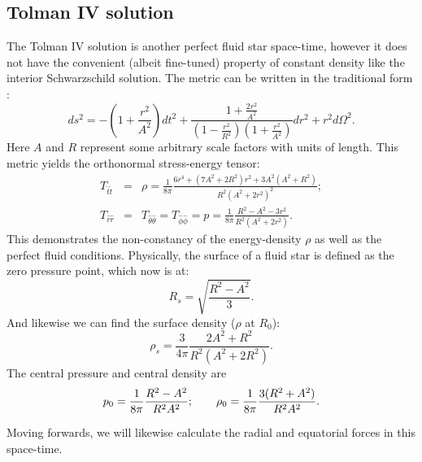 \documentclass[12pt]{article}
\begin{document}
\subsection{Tolman IV solution}
The Tolman IV solution is another perfect fluid star space-time, however it does not have the convenient (albeit fine-tuned) property of constant density like the interior Schwarzschild solution. The metric can be written in the traditional form \cite{Delgaty}:
%
\begin{equation}
    ds^2 = -\left(1 + \frac{r^2}{A^2}\right)dt^2 +  \frac{1  + \frac{2r^2}{A^2}}{\left(1- \frac{r^2}{R^2}\right)\left(1+ \frac{r^2}{A^2}\right)}dr^2 + r^2d\Omega^2.
\end{equation}
%
Here $A$ and $R$ represent some arbitrary scale factors with units of length. This metric yields the orthonormal stress-energy tensor: 
%
\begin{eqnarray}
    T_{\hat{t}\hat{t}} &=& \rho =  \frac{1}{8\pi}\frac{6r^4 + (7A^2 + 2R^2) r^2 + 3A^2(A^2 + R^2)}{ R^2(A^2 + 2r^2)^2};\\
    T_{\hat{r}\hat{r}} &=& T_{\hat{\theta}\hat{\theta}} = T_{\hat{\phi}\hat{\phi}} = p =   \frac{1}{8\pi } \frac{R^2 - A^2 - 3r^2}{R^2(A^2 + 2r^2)}.
\end{eqnarray}
%
This demonstrates the non-constancy of the energy-density $\rho$ as well as the perfect fluid conditions. Physically, the surface of a fluid star is defined as the zero pressure point, which now is at:
%
\begin{equation}
    \label{eq:R_s}
    R_s = \sqrt{\frac{R^2 - A^2}{3}}.
\end{equation}
%
And likewise we can find the surface density ($\rho$ at $R_0$):
%
\begin{equation}
    \rho_s = \frac{3}{4\pi }\frac{2A^2 + R^2}{R^2(A^2 + 2R^2)}.
\end{equation}
%
The central pressure and central density are
\begin{equation}
p_0 = {1\over8\pi} {R^2-A^2\over R^2 A^2}; \qquad
\rho_0 ={1\over8\pi} {3(R^2+A^2)\over R^2 A^2}.
\end{equation}



Moving forwards, we will likewise calculate the radial and equatorial forces in this space-time.

\end{document}
